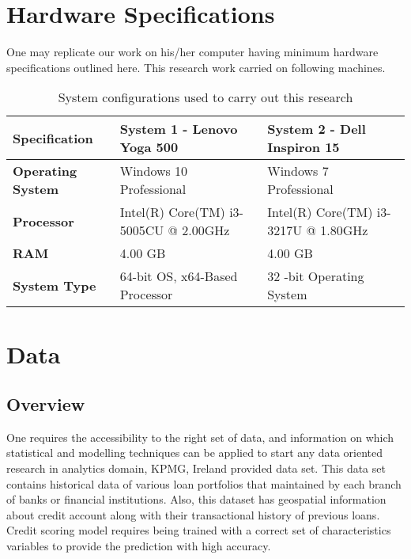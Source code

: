 \section{Hardware Specifications}
One may replicate our work on his/her computer having minimum hardware specifications outlined here. This research work carried on following machines. 
\begin{table}[!htb]
\centering
\caption{System configurations used to carry out this research}
\label{osc4}
\begin{tabular}{|p{3cm}|p{5cm}|p{5cm}|}
\toprule
\textbf{Specification}    & \textbf{System 1 - Lenovo Yoga 500}   & \textbf{System 2 - Dell Inspiron 15} \\ \midrule
\textbf{Operating System} & Windows 10 Professional               & Windows 7 Professional               \\
\textbf{Processor}        & Intel(R) Core(TM) i3-5005CU @ 2.00GHz & Intel(R) Core(TM) i3-3217U @ 1.80GHz \\
\textbf{RAM}              & 4.00 GB                               & 4.00 GB                              \\
\textbf{System Type}      & 64-bit OS, x64-Based Processor        & 32 -bit Operating System             \\ \bottomrule
\end{tabular}
\end{table}


\section{Data}\label{ch4.3}

\subsection{Overview}
One requires the accessibility to the right set of data, and information on which statistical and modelling techniques can be applied to start any data oriented research in analytics domain, KPMG, Ireland provided data set. This data set contains historical data of various loan portfolios that maintained by each branch of banks or financial institutions. Also, this dataset has geospatial information about credit account along with their transactional history of previous loans. Credit scoring model requires being trained with a correct set of characteristics variables to provide the prediction with high accuracy.


